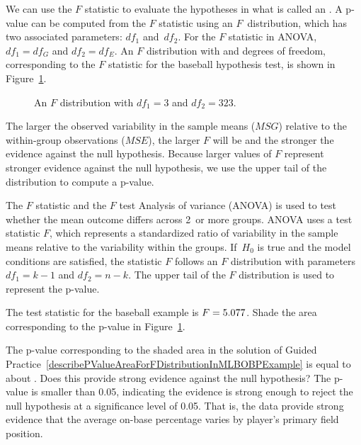 We can use the $F$ statistic to evaluate the hypotheses in
what is called an .
A p-value can be computed from the $F$ statistic using
an $F$~distribution, which has two associated parameters:
$df_{1}$ and~$df_{2}$.
For the $F$ statistic in ANOVA,
$df_{1} = df_{G}$ and $df_{2} = df_{E}$.
An $F$ distribution with \mlbDFA{} and \mlbDFB{} degrees
of freedom, corresponding to the $F$ statistic for the
baseball hypothesis test, is shown in
Figure~\ref{fDist2And423}.

\begin{figure}[ht]
  \centering
  \caption{An $F$ distribution with $df_1=3$ and $df_2=323$.}
  \label{fDist2And423}
\end{figure}

The larger the observed variability in the sample
means ($MSG$) relative to the within-group observations ($MSE$),
the larger $F$ will be and the stronger the evidence against
the null hypothesis.
Because larger values of $F$ represent stronger evidence against
the null hypothesis, we use the upper tail of the distribution
to compute a p-value.

\begin{onebox}{The $F$ statistic and the $F$ test}
  Analysis of variance (ANOVA) is used to test whether
  the mean outcome differs across 2~or more groups.
  ANOVA uses a test statistic $F$, which represents
  a standardized ratio of variability in the sample means
  relative to the variability within the groups.
  If~$H_0$ is true and the model conditions are satisfied,
  the statistic $F$ follows an $F$ distribution with
  parameters $df_{1} = k - 1$ and $df_{2} = n - k$.
  The upper tail of the $F$ distribution is used to
  represent the p-value.
\end{onebox}

\begin{exercisewrap}
\begin{nexercise}
\label{describePValueAreaForFDistributionInMLBOBPExample}%
The test statistic for the baseball example is $F = 5.077{}$.
Shade the area corresponding to the p-value in
Figure~\ref{fDist2And423}. \footnotemark{}
\end{nexercise}
\end{exercisewrap}

\begin{examplewrap}
\begin{nexample}{The p-value corresponding to the shaded area
    in the solution of Guided
    Practice~\ref{describePValueAreaForFDistributionInMLBOBPExample}
    is equal to about \mlbPvalue{}.
    Does this provide strong evidence against the null hypothesis?}
  The p-value is smaller than 0.05, indicating the evidence
  is strong enough to reject the null hypothesis
  at a significance level of 0.05.
  That is, the data provide strong evidence that the average
  on-base percentage varies by player's primary field position.
\end{nexample}
\end{examplewrap}


